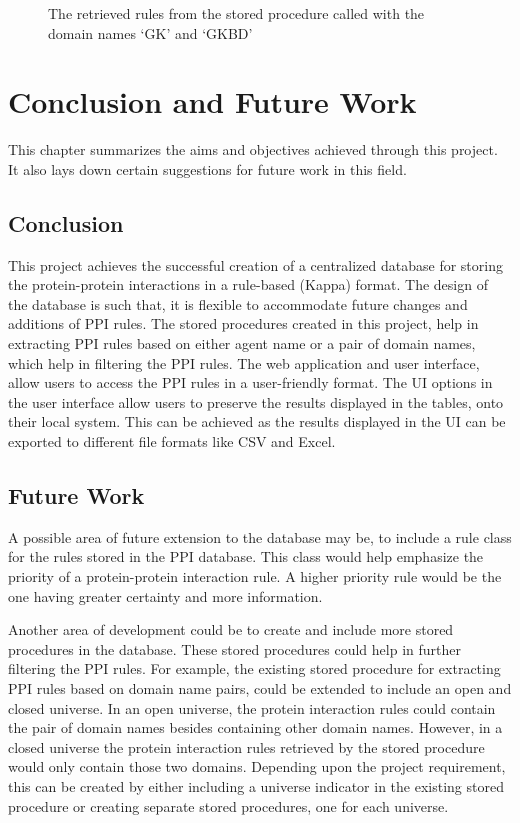 \documentclass[msc,deptreport,ai]{infthesis}      %
\begin{document}
\begin{enumerate}
\begin{figure}[H]
		\caption{The retrieved rules from the stored procedure called with the domain names `GK' and `GKBD'}
		\label{fig:CorrectnessDomainName2}		
	\end{figure}	
\end{enumerate}

\chapter{Conclusion and Future Work}
This chapter summarizes the aims and objectives achieved through this project. It also lays down certain suggestions for future work in this field.

\section{Conclusion}
This project achieves the successful creation of a centralized database for storing the protein-protein interactions in a rule-based (Kappa) format. The design of the database is such that, it is flexible to accommodate future changes and additions of PPI rules. The stored procedures created in this project, help in extracting PPI rules based on either agent name or a pair of domain names, which help in filtering the PPI rules. The web application and user interface, allow users to access the PPI rules in a user-friendly format. The UI options in the user interface allow users to preserve the results displayed in the tables, onto their local system. This can be achieved as the results displayed in the UI can be exported to different file formats like CSV and Excel.
\section{Future Work}
A possible area of future extension to the database may be, to include a rule class for the rules stored in the PPI database. This class would help emphasize the priority of a protein-protein interaction rule. A higher priority rule would be the one having greater certainty and more information.

Another area of development could be to create and include more stored procedures in the database. These stored procedures could help in further filtering the PPI rules. For example, the existing stored procedure for extracting PPI rules based on domain name pairs, could be extended to include an open and closed universe. In an open universe, the protein interaction rules could contain the pair of domain names besides containing other domain names. However, in a closed universe the protein interaction rules retrieved by the stored procedure would only contain those two domains. Depending upon the project requirement, this can be created by either including a universe indicator in the existing stored procedure or creating separate stored procedures, one for each universe.
\end{document}
